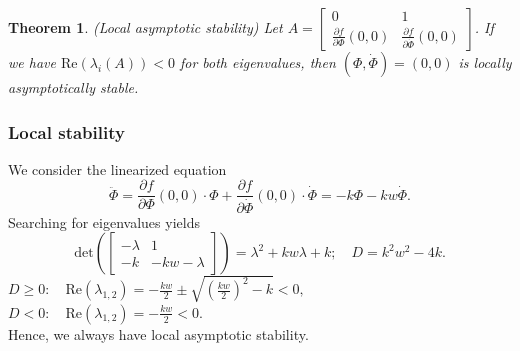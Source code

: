 \documentclass[12pt]{article}
\newtheorem{theorem}{Theorem}
\begin{document}
\begin{theorem}(Local asymptotic stability)
Let $A = \begin{bmatrix} 0 & 1 \\ \frac{\partial f}{\partial \Phi}(0,0) & \frac{\partial f}{\partial \dot{\Phi}}(0,0) \end{bmatrix}$. If we have $\mathrm{Re} (\lambda_i(A)) < 0$ for both eigenvalues, then $(\Phi, \dot{\Phi}) = (0, 0)$ is locally asymptotically stable.

\end{theorem}

\subsubsection*{Local stability}
We consider the linearized equation 
$$\ddot{\Phi} = \frac{\partial f}{\partial \Phi}(0,0) \cdot \Phi + \frac{\partial f}{\partial \dot{\Phi}}(0,0) \cdot \dot{\Phi} = -k\Phi - kw\dot{\Phi} .$$
Searching for eigenvalues yields
$$ \mathrm{det} \left( \begin{bmatrix} -\lambda & 1 \\ -k & -kw - \lambda \end{bmatrix} \right) = \lambda^2 + kw \lambda + k; \quad D = k^2w^2 - 4k. $$
 $ D \geq 0: \quad \mathrm{Re}(\lambda_{1,2}) = -\frac{kw}{2} \pm \sqrt{ \left( \frac{kw}{2} \right)^2  -k } < 0,$
 \\
 $ D < 0: \quad  \mathrm{Re}(\lambda_{1,2}) = -\frac{kw}{2} < 0.$
 \\
Hence, we always have local asymptotic stability.
\end{document}
